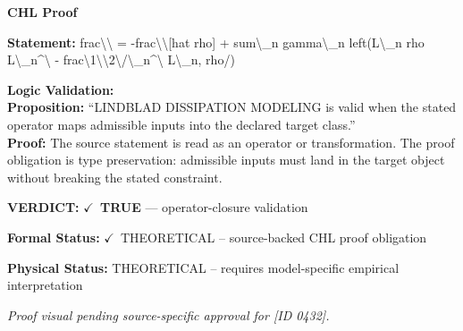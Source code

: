 \vspace{0.45em}
\noindent\textbf{CHL Proof}\par
\textbf{Statement:} frac\textbackslash{}\textbackslash{} = -frac\textbackslash{}\textbackslash{}[hat rho] + sum\textbackslash{}\_n gamma\textbackslash{}\_n left(L\textbackslash{}\_n rho L\textbackslash{}\_n\textasciicircum{}\textbackslash{} - frac\textbackslash{}1\textbackslash{}\textbackslash{}2\textbackslash{}/\textbackslash{}\_n\textasciicircum{}\textbackslash{}
L\textbackslash{}\_n, rho/)

\textbf{Logic Validation:}\\
\textbf{Proposition:} ``LINDBLAD DISSIPATION MODELING is valid when the stated operator maps admissible inputs
into the declared target class.''\\
\textbf{Proof:} The source statement is read as an operator or transformation. The proof obligation is
type preservation: admissible inputs must land in the target object without breaking the
stated constraint.

\textbf{VERDICT:} \ensuremath{\checkmark}\ \textbf{TRUE} --- operator-closure validation

\textbf{Formal Status:} \ensuremath{\checkmark}\ THEORETICAL -- source-backed CHL proof obligation

\textbf{Physical Status:} THEORETICAL -- requires model-specific empirical interpretation
\par\vspace{0.45em}
\par
\vfill
\begingroup\footnotesize\itshape
Proof visual pending source-specific approval for [ID 0432].
\par\endgroup
\vfill
\endgroup
\endgroup
